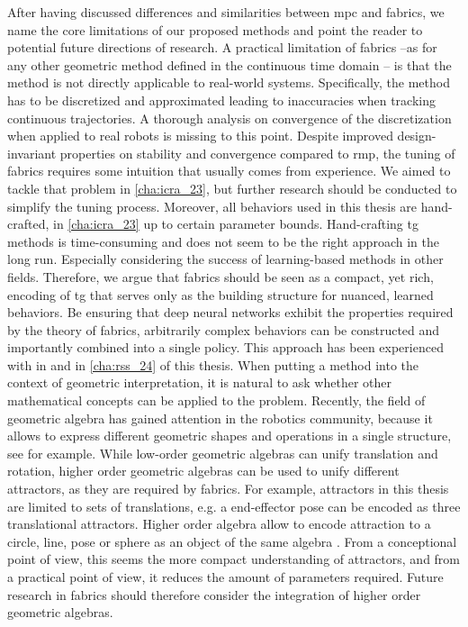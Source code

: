 After having discussed differences and similarities between
\ac{mpc} and \ac{fabrics}, we name the core limitations of
our proposed methods and point the reader to potential
future directions of research. 
A practical limitation of \ac{fabrics} --as for any other
geometric method defined in the continuous time domain --
is that the method is not directly applicable to real-world
systems. Specifically, the method has to be discretized and
approximated leading to inaccuracies when tracking continuous
trajectories. A thorough analysis on convergence of the discretization
when applied to real robots is missing to this point.
Despite improved design-invariant properties on stability
and convergence compared to \ac{rmp}, the tuning of \ac{fabrics} requires some
intuition that usually comes from experience. We aimed to
tackle that problem in \cref{cha:icra_23}, but further
research should be conducted to simplify the tuning process.
Moreover, all behaviors used in this thesis are
hand-crafted, in \cref{cha:icra_23} up to certain
parameter bounds. Hand-crafting \ac{tg} methods is time-consuming
and does not seem to be the right approach in the long run.
Especially considering the success of learning-based methods
in other fields. Therefore, we argue that \ac{fabrics}
should be seen as a compact, yet rich, encoding of
\ac{tg} that serves only as the building structure for
nuanced, learned behaviors. Be ensuring that deep neural
networks exhibit the properties required by the theory of 
\ac{fabrics}, arbitrarily complex behaviors can be
constructed and importantly combined into a single policy.
This approach has been experienced with in \cite{xie2023neural}
and in \cref{cha:rss_24} of this thesis.
When putting a method into the context of geometric
interpretation, it is natural to ask whether other
mathematical concepts can be applied to the problem.
Recently, the field of geometric algebra has gained 
attention in the robotics community, because it allows
to express different geometric shapes and operations in a
single structure, see \cite{low2023geometric} for example.
While low-order geometric algebras can unify translation and
rotation, higher order geometric algebras can be used to unify
different attractors, as they are required by \ac{fabrics}.
For example, attractors in this thesis are limited to
sets of translations, e.g. a end-effector pose can be
encoded as three translational attractors. Higher order
algebra allow to encode attraction to a circle, line, pose
or sphere as an object of the same algebra \cite{low2023geometric}.
From a conceptional point of view, this seems the more
compact understanding of attractors, and from a practical
point of view, it reduces the amount of parameters required.
Future research in \ac{fabrics} should therefore consider
the integration of higher order geometric algebras.

